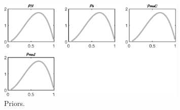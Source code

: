 \begin{figure}[H]
\centering
\includegraphics[width=0.80\textwidth]{RBC_sectoral/graphs/RBC_sectoral_Priors4}
\caption{Priors.}\label{Fig:Priors:4}
\end{figure}
 
